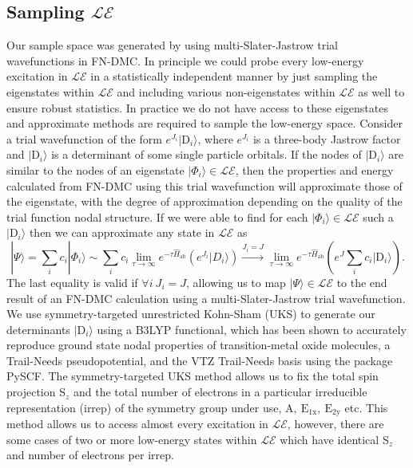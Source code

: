 \documentclass{article}
\begin{document}
\subsection{Sampling $\mathcal{LE}$}
Our sample space was generated by using multi-Slater-Jastrow trial wavefunctions in FN-DMC. 
In principle we could probe every low-energy excitation in $\mathcal{LE}$ in a statistically independent manner by just sampling the eigenstates within $\mathcal{LE}$ and including various non-eigenstates within $\mathcal{LE}$ as well to ensure robust statistics.
In practice we do not have access to these eigenstates and approximate methods are required to sample the low-energy space. 
Consider a trial wavefunction of the form $e^{J_i} |\text{D}_i\rangle$, where $e^{J_i}$ is a three-body Jastrow factor and $|\text{D}_i\rangle$ is a determinant of some single particle orbitals.
If the nodes of $|\text{D}_i\rangle$ are similar to the nodes of an eigenstate $|\Phi_i\rangle \in \mathcal{LE}$, then the properties and energy calculated from FN-DMC using this trial wavefunction will approximate those of the eigenstate, with the degree of approximation depending on the quality of the trial function nodal structure.
If we were able to find for each $|\Phi_i \rangle \in \mathcal{LE}$ such a $|\text{D}_i\rangle$ then we can approximate any state in $\mathcal{LE}$ as
\begin{equation}
|\Psi\rangle = \sum_i c_i |\Phi_i\rangle \sim \sum_i c_i \lim_{\tau \rightarrow \infty} e^{-\tau \hat{H}_\text{ab}} (e^{J_i} |D_i\rangle) \xrightarrow{J_i = J} \lim_{\tau \rightarrow \infty} e^{-\tau \hat{H}_\text{ab}} (e^{J}\sum_{i} c_i|\text{D}_i\rangle).
\label{eq:sampling}
\end{equation}
The last equality is valid if $\forall i\  J_i = J$, allowing us to map $|\Psi \rangle \in \mathcal{LE}$ to the end result of an FN-DMC calculation using a multi-Slater-Jastrow trial wavefunction. We use symmetry-targeted unrestricted Kohn-Sham (UKS) to generate our determinants $|\text{D}_i\rangle$ using a B3LYP functional, which has been shown to accurately reproduce ground state nodal properties of transition-metal oxide molecules, a Trail-Needs pseudopotential, and the VTZ Trail-Needs basis using the package PySCF.
The symmetry-targeted UKS method allows us to fix the total spin projection S$_z$ and the total number of electrons in a particular irreducible representation (irrep) of the symmetry group under use, $\text{A},\ \text{E}_\text{1x},\ \text{E}_\text{2y}$ etc.
This method allows us to access almost every excitation in $\mathcal{LE}$, however, there are some cases of two or more low-energy states within $\mathcal{LE}$ which have identical S$_z$ and number of electrons per irrep.
\end{document}
